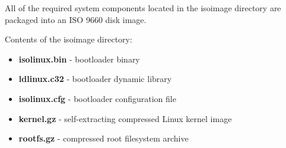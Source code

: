 All of the required system components located in the isoimage directory are packaged into an ISO 9660 disk image.

\noindent
Contents of the isoimage directory:

\begin{itemize}
    \item \textbf{isolinux.bin} - bootloader binary
    \item \textbf{ldlinux.c32} - bootloader dynamic library
    \item \textbf{isolinux.cfg} - bootloader configuration file
    \item \textbf{kernel.gz} - self-extracting compressed Linux kernel image
    \item \textbf{rootfs.gz} - compressed root filesystem archive 
\end{itemize}
